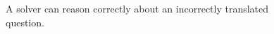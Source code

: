 \begin{figure}[H]
\centering
{}
\caption{A solver can reason correctly about an incorrectly translated question.}\label{fig:teach-M04-10}
\end{figure}
